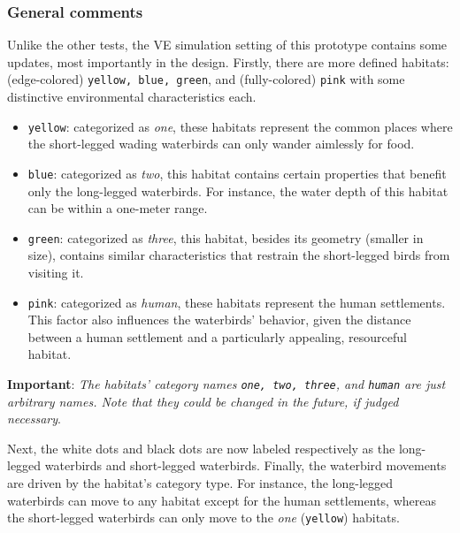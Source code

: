 \subsubsection{General comments}
Unlike the other tests, the VE simulation setting of this prototype contains some updates, most importantly in the design. Firstly, there are more defined habitats: (edge-colored) \texttt{yellow, blue, green}, and (fully-colored) \texttt{pink} with some distinctive environmental characteristics each.
\begin{itemize}
    \item \texttt{yellow}: categorized as \emph{one}, these habitats represent the common places where the short-legged wading waterbirds can only wander aimlessly for food.
    \item \texttt{blue}: categorized as \emph{two}, this habitat contains certain properties that benefit only the long-legged waterbirds. For instance, the water depth of this habitat can be within a one-meter range.
    \item \texttt{green}: categorized as \emph{three}, this habitat, besides its geometry (smaller in size), contains similar characteristics that restrain the short-legged birds from visiting it.
    \item \texttt{pink}: categorized as \emph{human}, these habitats represent the human settlements. This factor also influences the waterbirds' behavior, given the distance between a human settlement and a particularly appealing, resourceful habitat.
\end{itemize}

\noindent
\textbf{Important}: \textit{The habitats' category names \texttt{one, two, three}, and \texttt{human} are just arbitrary names. Note that they could be changed in the future, if judged necessary}.

\noindent
Next, the white dots and black dots are now labeled respectively as the long-legged waterbirds and short-legged waterbirds. Finally, the waterbird movements are driven by the habitat's category type. For instance, the long-legged waterbirds can move to any habitat except for the human settlements, whereas the short-legged waterbirds can only move to the \emph{one} (\texttt{yellow}) habitats.

